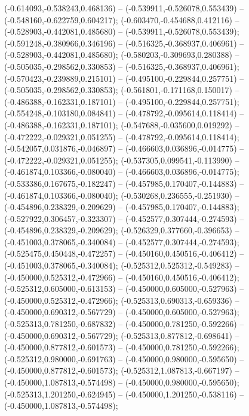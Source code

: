  (-0.614093,-0.538243,0.468136) -- (-0.539911,-0.526078,0.553439) -- (-0.548160,-0.622759,0.604217);
 (-0.603470,-0.454688,0.412116) -- (-0.528903,-0.442081,0.485680) -- (-0.539911,-0.526078,0.553439);
 (-0.591248,-0.380966,0.346196) -- (-0.516325,-0.368937,0.406961) -- (-0.528903,-0.442081,0.485680);
 (-0.580203,-0.309693,0.280388) -- (-0.505035,-0.298562,0.330853) -- (-0.516325,-0.368937,0.406961);
 (-0.570423,-0.239889,0.215101) -- (-0.495100,-0.229844,0.257751) -- (-0.505035,-0.298562,0.330853);
 (-0.561801,-0.171168,0.150017) -- (-0.486388,-0.162331,0.187101) -- (-0.495100,-0.229844,0.257751);
 (-0.554248,-0.103180,0.084841) -- (-0.478792,-0.095614,0.118414) -- (-0.486388,-0.162331,0.187101);
 (-0.547688,-0.035600,0.019292) -- (-0.472222,-0.029321,0.051255) -- (-0.478792,-0.095614,0.118414);
 (-0.542057,0.031876,-0.046897) -- (-0.466603,0.036896,-0.014775) -- (-0.472222,-0.029321,0.051255);
 (-0.537305,0.099541,-0.113990) -- (-0.461874,0.103366,-0.080040) -- (-0.466603,0.036896,-0.014775);
 (-0.533386,0.167675,-0.182247) -- (-0.457985,0.170407,-0.144883) -- (-0.461874,0.103366,-0.080040);
 (-0.530268,0.236555,-0.251930) -- (-0.454896,0.238329,-0.209629) -- (-0.457985,0.170407,-0.144883);
 (-0.527922,0.306457,-0.323307) -- (-0.452577,0.307444,-0.274593) -- (-0.454896,0.238329,-0.209629);
 (-0.526329,0.377660,-0.396653) -- (-0.451003,0.378065,-0.340084) -- (-0.452577,0.307444,-0.274593);
 (-0.525475,0.450448,-0.472257) -- (-0.450160,0.450516,-0.406412) -- (-0.451003,0.378065,-0.340084);
 (-0.525312,0.525312,-0.549283) -- (-0.450000,0.525312,-0.472966) -- (-0.450160,0.450516,-0.406412);
 (-0.525312,0.605000,-0.613153) -- (-0.450000,0.605000,-0.527963) -- (-0.450000,0.525312,-0.472966);
 (-0.525313,0.690313,-0.659336) -- (-0.450000,0.690312,-0.567729) -- (-0.450000,0.605000,-0.527963);
 (-0.525313,0.781250,-0.687832) -- (-0.450000,0.781250,-0.592266) -- (-0.450000,0.690312,-0.567729);
 (-0.525313,0.877812,-0.698641) -- (-0.450000,0.877812,-0.601573) -- (-0.450000,0.781250,-0.592266);
 (-0.525312,0.980000,-0.691763) -- (-0.450000,0.980000,-0.595650) -- (-0.450000,0.877812,-0.601573);
 (-0.525312,1.087813,-0.667197) -- (-0.450000,1.087813,-0.574498) -- (-0.450000,0.980000,-0.595650);
 (-0.525313,1.201250,-0.624945) -- (-0.450000,1.201250,-0.538116) -- (-0.450000,1.087813,-0.574498);

